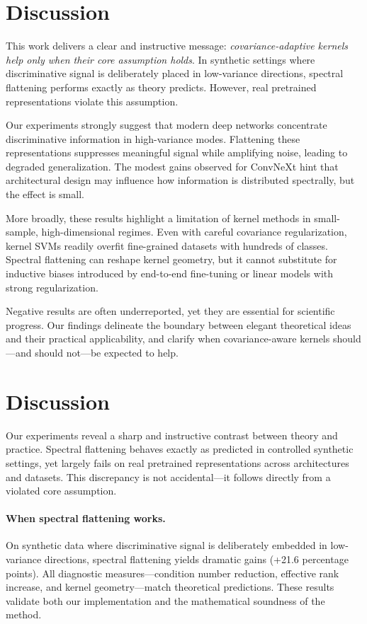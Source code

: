\documentclass{article}
\begin{document}
\section{Discussion}

This work delivers a clear and instructive message: \emph{covariance-adaptive kernels help only when their core assumption holds}. In synthetic settings where discriminative signal is deliberately placed in low-variance directions, spectral flattening performs exactly as theory predicts. However, real pretrained representations violate this assumption.

Our experiments strongly suggest that modern deep networks concentrate discriminative information in high-variance modes. Flattening these representations suppresses meaningful signal while amplifying noise, leading to degraded generalization. The modest gains observed for ConvNeXt hint that architectural design may influence how information is distributed spectrally, but the effect is small.

More broadly, these results highlight a limitation of kernel methods in small-sample, high-dimensional regimes. Even with careful covariance regularization, kernel SVMs readily overfit fine-grained datasets with hundreds of classes. Spectral flattening can reshape kernel geometry, but it cannot substitute for inductive biases introduced by end-to-end fine-tuning or linear models with strong regularization.

Negative results are often underreported, yet they are essential for scientific progress. Our findings delineate the boundary between elegant theoretical ideas and their practical applicability, and clarify when covariance-aware kernels should—and should not—be expected to help.

\section{Discussion}

Our experiments reveal a sharp and instructive contrast between theory and practice. Spectral flattening behaves exactly as predicted in controlled synthetic settings, yet largely fails on real pretrained representations across architectures and datasets. This discrepancy is not accidental—it follows directly from a violated core assumption.

\paragraph{When spectral flattening works.}
On synthetic data where discriminative signal is deliberately embedded in low-variance directions, spectral flattening yields dramatic gains (+21.6 percentage points). All diagnostic measures—condition number reduction, effective rank increase, and kernel geometry—match theoretical predictions. These results validate both our implementation and the mathematical soundness of the method.
\end{document}
